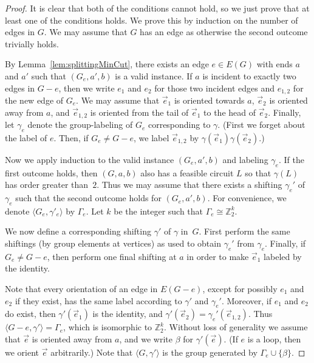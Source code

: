 \documentclass[a4paper, 12pt]{article}
\begin{document}
\begin{proof}
    It is clear that both of the conditions cannot hold, so we just prove that at least one of the conditions holds. We prove this by induction on the number of edges in $G$. We may assume that $G$ has an edge as otherwise the second outcome trivially holds.

    By Lemma~\ref{lem:splittingMinCut}, there exists an edge $e \in E(G)$ with ends $a$ and $a'$ such that $(G_e, a', b)$ is a valid instance. If $a$ is incident to exactly two edges in $G-e$, then we write $e_1$ and $e_2$ for those two incident edges and $e_{1,2}$ for the new edge of $G_e$. We may assume that $\vec{e}_1$ is oriented towards $a$, $\vec{e}_2$ is oriented away from $a$, and $\vec{e}_{1,2}$ is oriented from the tail of $\vec{e}_1$ to the head of $\vec{e}_2$. Finally, let $\gamma_e$ denote the group-labeling of $G_e$ corresponding to $\gamma$. (First we forget about the label of $e$. Then, if $G_e \neq G-e$, we label $\vec{e}_{1,2}$ by $\gamma(\vec{e}_1)\gamma(\vec{e}_2)$.) 

    Now we apply induction to the valid instance $(G_e, a', b)$ and labeling $\gamma_e$. If the first outcome holds, then $(G, a,b)$ also has a feasible circuit $L$ so that $\gamma(L)$ has order greater than~$2$. Thus we may assume that there exists a shifting $\gamma_e'$ of $\gamma_e$ such that the second outcome holds for $(G_e, a', b)$. For convenience, we denote $\langle G_e, \gamma'_e\rangle$ by $\Gamma_e$. Let $k$ be the integer such that $\Gamma_e \cong \mathbb{Z}_2^k$. 
    
    We now define a corresponding shifting $\gamma'$ of $\gamma$ in~$G$. First perform the same shiftings (by group elements at vertices) as used to obtain $\gamma_e'$ from $\gamma_e$. Finally, if $G_e\neq G-e$, then perform one final shifting at $a$ in order to make $\vec{e}_1$ labeled by the identity.
    

    Note that every orientation of an edge in $E(G-e)$, except for possibly $e_1$ and $e_2$ if they exist, has the same label according to $\gamma'$ and $\gamma_e'$. Moreover, if $e_1$ and $e_2$ do exist, then $\gamma'(\vec{e}_1)$ is the identity, and $\gamma'(\vec{e}_2)=\gamma_e'(\vec{e}_{1,2})$. Thus $\langle G - e, \gamma'\rangle = \Gamma_e$, which is isomorphic to $\mathbb{Z}_2^k$. Without loss of generality we assume that $\vec{e}$ is oriented away from $a$, and we write $\beta$ for $\gamma'(\vec{e})$. (If $e$ is a loop, then we orient $\vec{e}$ arbitrarily.) Note that $\langle G, \gamma'\rangle$ is the group generated by $\Gamma_e \cup \{\beta\}$.


\end{proof}
\end{document}
